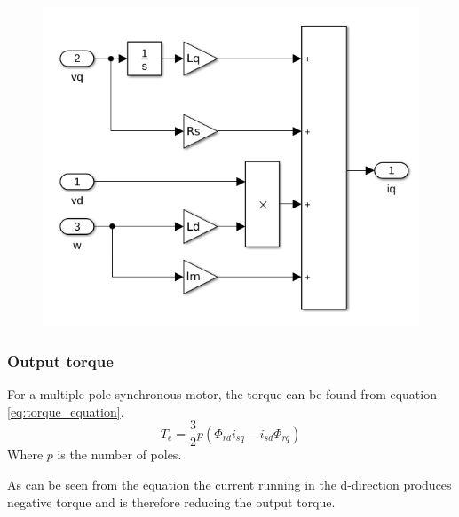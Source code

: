 
\begin{figure}[H]
	\centering
	\includegraphics[width=0.5\linewidth]{pictures/control/simulink_q_direction.png}
	\caption{}
	\label{fig:simulink_d_direction}
\end{figure}

\subsubsection{Output torque}
For a multiple pole synchronous motor, the torque can be found from equation \ref{eq:torque_equation}.
\begin{equation}\label{eq:torque_equation}
T_e = \frac{3}{2} p (\Phi_{rd} i_{sq} - i_{sd} \Phi_{rq})
\end{equation}
Where $p$ is the number of poles.

As can be seen from the equation the current running in the d-direction produces negative torque and is therefore reducing the output torque. 
